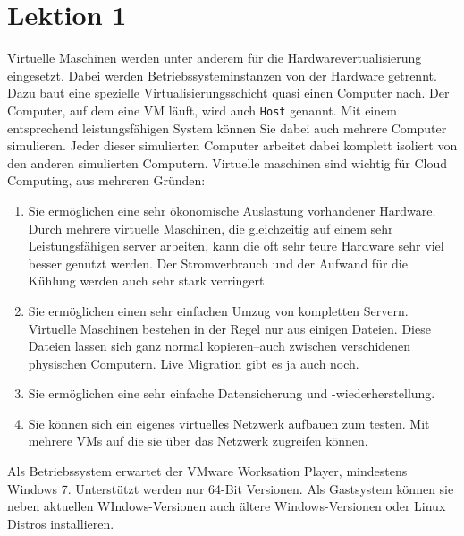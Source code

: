 \documentclass[a4paper,10pt]{article}
\begin{document}
\section{Lektion 1}
Virtuelle Maschinen werden unter anderem für die Hardwarevertualisierung eingesetzt. Dabei werden Betriebssysteminstanzen von der Hardware getrennt. Dazu baut eine spezielle Virtualisierungsschicht quasi einen Computer nach. Der Computer, auf dem eine VM läuft, wird auch \texttt{Host} genannt. Mit einem entsprechend leistungsfähigen System können Sie dabei auch mehrere Computer simulieren. Jeder dieser simulierten Computer arbeitet dabei komplett isoliert von den anderen simulierten Computern.
\vspace{3mm}
Virtuelle maschinen sind wichtig für Cloud Computing, aus mehreren Gründen:
\begin{enumerate}
	\item Sie ermöglichen eine sehr ökonomische Auslastung vorhandener Hardware. Durch mehrere virtuelle Maschinen, die gleichzeitig auf einem sehr Leistungsfähigen server arbeiten, kann die oft sehr teure Hardware sehr viel besser genutzt werden. Der Stromverbrauch und der Aufwand für die Kühlung werden auch sehr stark verringert.
	\item Sie ermöglichen einen sehr einfachen Umzug von kompletten Servern. Virtuelle Maschinen bestehen in der Regel nur aus einigen Dateien. Diese Dateien lassen sich ganz normal kopieren--auch zwischen verschidenen physischen Computern. Live Migration gibt es ja auch noch.
	\item Sie ermöglichen eine sehr einfache Datensicherung und -wiederherstellung.
	\item Sie können sich ein eigenes virtuelles Netzwerk aufbauen zum testen. Mit mehrere VMs auf die sie über das Netzwerk zugreifen können.
\end{enumerate}
\vspace{3mm}
Als Betriebssystem erwartet der VMware Worksation Player, mindestens Windows 7. Unterstützt werden nur 64-Bit Versionen. Als Gastsystem können sie neben aktuellen WIndows-Versionen auch ältere Windows-Versionen oder Linux Distros installieren.
\end{document}
